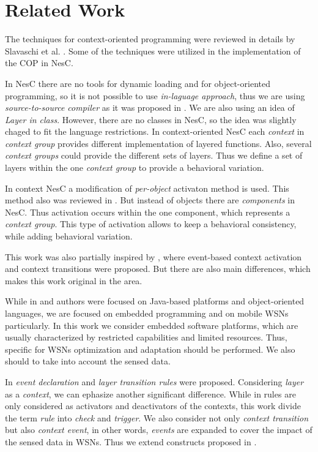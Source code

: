 \documentclass{ubicomp-ext}
\begin{document}
\section{Related Work}
The techniques for context-oriented programming were reviewed in details by Slavaschi et al. \cite{salvaneschi12}. Some of the techniques were utilized in the implementation of the COP in NesC.

In NesC there are no tools for dynamic loading and for object-oriented programming, so it is not possible to use \textit{in-laguage approach}, thus we are using \textit{source-to-source compiler} as it was proposed in \cite{salvaneschi12}. We are also using an idea of \textit{Layer in class}\cite{salvaneschi12}. However, there are no classes in NesC, so the idea was slightly chaged to fit the language restrictions. In context-oriented NesC each \textit{context} in \textit{context group} provides different implementation of layered functions. Also, several \textit{context groups} could provide the different sets of layers. Thus we define a set of layers within the one \textit{context group} to provide a behavioral variation.

In context NesC a modification of \textit{per-object} activaton method is used. This method also was reviewed in \cite{salvaneschi12}. But instead of objects there are \textit{components} in NesC. Thus activation occurs within the one component, which represents a \textit{context group}. This type of activation allows to keep a behavioral consistency, while adding behavioral variation.

This work was also partially inspired by \cite{kamina11}, where event-based context activation and context transitions were proposed. But there are also main differences, which makes this work original in the area.

While in \cite{kamina11} and \cite{kamina10} authors were focused on Java-based platforms and object-oriented languages, we are focused on embedded programming and on mobile WSNs particularly. In this work we consider embedded software platforms, which are usually characterized by restricted capabilities and limited resources. Thus, specific for WSNs optimization and adaptation should be performed. We also should to take into account the sensed data.

In \cite{kamina11} \textit{event declaration} and \textit{layer transition rules} were proposed. Considering \textit{layer} as a \textit{context}, we can ephasize another significant difference. While in \cite{kamina11} rules are only considered as activators and deactivators of the contexts, this work divide the term \textit{rule} into \textit{check} and \textit{trigger}. We also consider not only \textit{context transition} but also \textit{context event}, in other words, \textit{events} are expanded to cover the impact of the sensed data in WSNs. Thus we extend constructs proposed in \cite{kamina11}.
\end{document}
